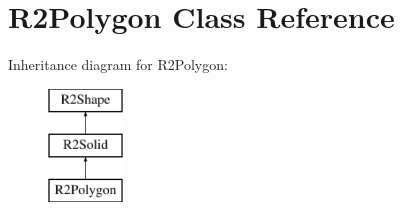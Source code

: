 \hypertarget{class_r2_polygon}{}\section{R2\+Polygon Class Reference}
\label{class_r2_polygon}
Inheritance diagram for R2\+Polygon\+:\begin{figure}[H]
\begin{center}
\leavevmode
\includegraphics[height=3.000000cm]{class_r2_polygon}
\end{center}
\end{figure}
